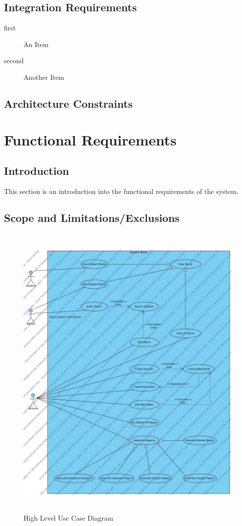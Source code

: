 \documentclass[a4paper]{article}
\begin{document}
		\subsection{Integration Requirements}

			\begin{description}

				\item[first]{An Item}

				\item[second]{Another Item}

			\end{description}

		\subsection{Architecture Constraints}

	\section{Functional Requirements}

		\subsection{Introduction}

			This section is an introduction into the functional requirements of the system.

		\subsection{Scope and Limitations/Exclusions}
		
			\begin{figure}[h]
				\caption{High Level Use Case Diagram}
				\includegraphics[height=15cm]{StudentMarks}
			\end{figure}
\end{document}
